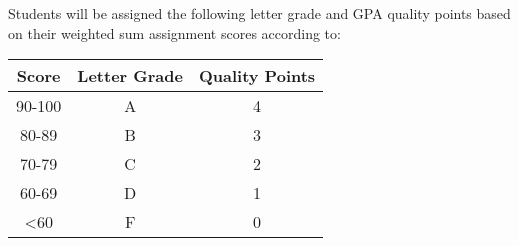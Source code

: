 Students will be assigned the following letter grade and GPA quality points based on their weighted sum assignment scores according to:

\begin{table*}[h!]
    \begin{tabular}{c | c | c}
        \toprule
        Score & Letter Grade & Quality Points \\
        
        \midrule
        90-100              & A     & 4 \\
        80-89               & B     & 3 \\
        70-79               & C     & 2 \\
        60-69\footnotemark  & D     & 1 \\
        <60                 & F     & 0 \\

        \bottomrule
    \end{tabular}
\end{table*}

